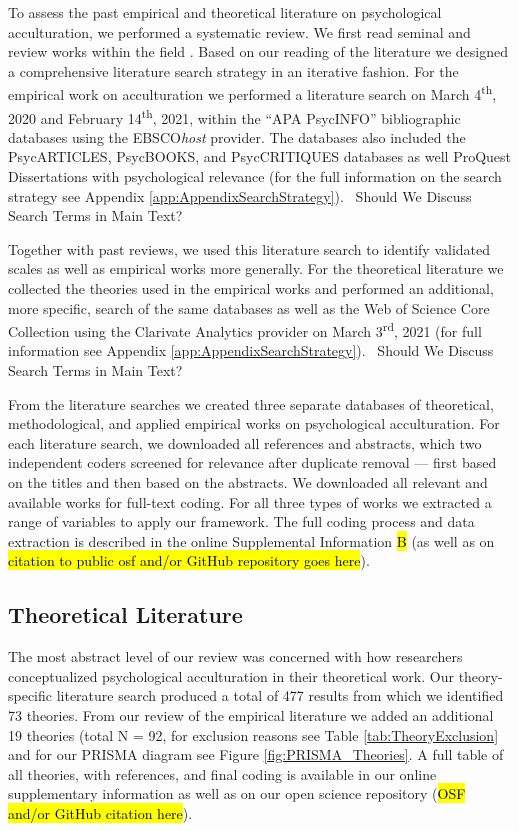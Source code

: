 To assess the past empirical and theoretical literature on psychological
acculturation, we performed a systematic review. We first read seminal
and review works within the field
\citep[including,][]{Ward2019, Berry1997b, Berry2003, Szapocznik1978, Sam2006a, Rudmin2003a}.
Based on our reading of the literature we designed a comprehensive
literature search strategy in an iterative fashion. For the empirical
work on acculturation we performed a literature search on March
4\textsuperscript{th}, 2020 and February 14\textsuperscript{th}, 2021,
within the ``APA PsycINFO'' bibliographic databases using the
EBSCO\textit{host} provider. The databases also included the
PsycARTICLES, PsycBOOKS, and PsycCRITIQUES databases as well ProQuest
Dissertations with psychological relevance (for the full information on
the search strategy see Appendix \ref{app:AppendixSearchStrategy}).
\Warning~Should We Discuss Search Terms in Main Text? \Warning

Together with past reviews, we used this literature search to identify
validated scales as well as empirical works more generally. For the
theoretical literature we collected the theories used in the empirical
works and performed an additional, more specific, search of the same
databases as well as the Web of Science Core Collection using the
Clarivate Analytics provider on March 3\textsuperscript{rd}, 2021 (for
full information see Appendix \ref{app:AppendixSearchStrategy}).
\Warning~Should We Discuss Search Terms in Main Text? \Warning~

From the literature searches we created three separate databases of
theoretical, methodological, and applied empirical works on
psychological acculturation. For each literature search, we downloaded
all references and abstracts, which two independent coders screened for
relevance after duplicate removal --- first based on the titles and then
based on the abstracts. We downloaded all relevant and available works
for full-text coding. For all three types of works we extracted a range
of variables to apply our framework. The full coding process and data
extraction is described in the online Supplemental Information \hl{B}
(as well as on
\hl{citation to public osf and/or GitHub repository goes here}).

\subsection{Theoretical Literature}

The most abstract level of our review was concerned with how researchers
conceptualized psychological acculturation in their theoretical work.
Our theory-specific literature search produced a total of 477 results
from which we identified 73 theories. From our review of the empirical
literature we added an additional 19 theories (total N = 92, for
exclusion reasons see Table \ref{tab:TheoryExclusion} and for our PRISMA
diagram see Figure \ref{fig:PRISMA_Theories}. A full table of all
theories, with references, and final coding is available in our online
supplementary information as well as on our open science repository
(\hl{OSF and/or GitHub citation here}).

